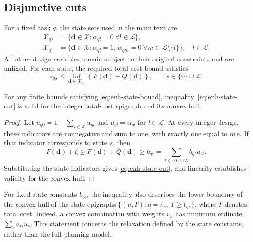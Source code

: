 \subsection{Disjunctive cuts}
\label{app:enh-state}

For a fixed task $q$, the state sets used in the main text are
\begin{equation}
    \begin{aligned}
    \mathcal X_{q0}
      &=\{\boldsymbol d\in\mathcal X:\alpha_{ql}=0\ \forall l\in\mathcal L\},\\
    \mathcal X_{ql}
      &=\{\boldsymbol d\in\mathcal X:\alpha_{ql}=1,\
         \alpha_{qm}=0\ \forall m\in\mathcal L\setminus\{l\}\},
         \quad l\in\mathcal L.
    \end{aligned}
    \label{eq:enh-app-states}
\end{equation}
All other design variables remain subject to their original constraints and are unfixed.
For each state, the required total-cost bound satisfies
\begin{equation}
    b_{qs}\le
    \inf_{\boldsymbol d\in\mathcal X_{qs}}
    \left\{F(\boldsymbol d)+Q(\boldsymbol d)\right\},
    \qquad s\in\{0\}\cup\mathcal L.
    \label{eq:enh-state-bound}
\end{equation}

\begin{proposition}
\label{prop:enh-state}
For any finite bounds satisfying \eqref{eq:enh-state-bound}, inequality~\eqref{eq:enh-state-cut} is valid for the integer total-cost epigraph and its convex hull.
\end{proposition}

\begin{proof}
Let $u_{q0}=1-\sum_{l\in\mathcal L}\alpha_{ql}$ and $u_{ql}=\alpha_{ql}$ for $l\in\mathcal L$.
At every integer design, these indicators are nonnegative and sum to one, with exactly one equal to one.
If that indicator corresponds to state $s$, then
\[
    F(\boldsymbol d)+\zeta
    \ge F(\boldsymbol d)+Q(\boldsymbol d)
    \ge b_{qs}
    =\sum_{t\in\{0\}\cup\mathcal L}b_{qt}u_{qt}.
\]
Substituting the state indicators gives \eqref{eq:enh-state-cut}, and linearity establishes validity for the convex hull.
\end{proof}

For fixed state constants $b_{qs}$, the inequality also describes the lower boundary of the convex hull of the state epigraphs $\{(u,T):u=e_s,\ T\ge b_{qs}\}$, where $T$ denotes total cost.
Indeed, a convex combination with weights $u_s$ has minimum ordinate $\sum_s b_{qs}u_s$.
This statement concerns the relaxation defined by the state constants, rather than the full planning model.

